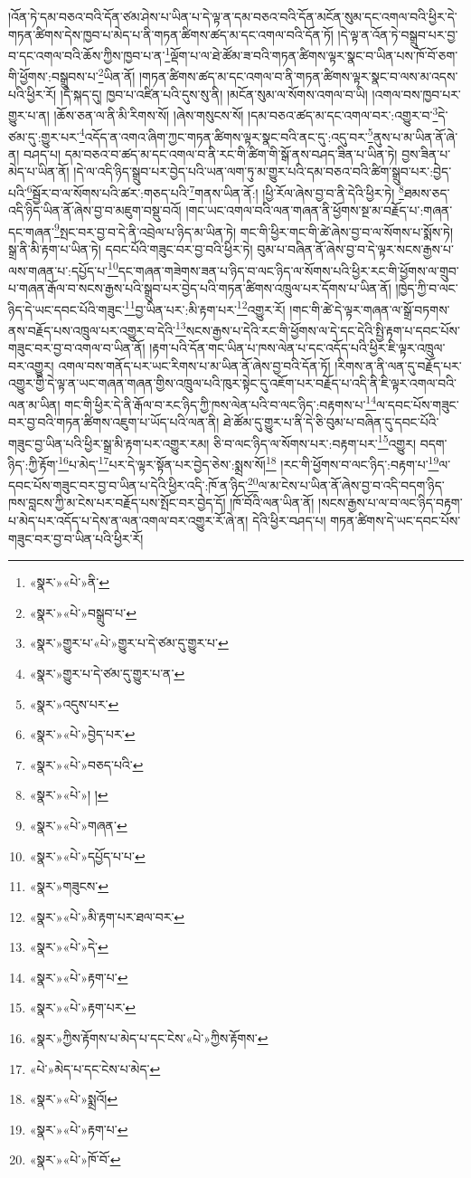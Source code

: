 །འོན་ཏེ་དམ་བཅའ་བའི་དོན་ཙམ་ཤེས་པ་ཡིན་པ་དེ་ལྟ་ན་དམ་བཅའ་བའི་དོན་མངོན་སུམ་དང་འགལ་བའི་ཕྱིར་དེ་གཏན་ཚིགས་དེས་ཁྱབ་པ་མེད་པ་ནི་གཏན་ཚིགས་ཚད་མ་དང་འགལ་བའི་དོན་ཏོ། །དེ་ལྟ་ན་འོན་ཏེ་བསྒྲུབ་པར་བྱ་བ་དང་འགལ་བའི་ཆོས་ཀྱིས་ཁྱབ་པ་ན་\footnote{«སྣར་»«པེ་»ནི་}ལྡོག་པ་ལ་ཐེ་ཚོམ་ཟ་བའི་གཏན་ཚིགས་ལྟར་སྣང་བ་ཡིན་པས་ཁོ་བོ་ཅག་གི་ཕྱོགས་:བསྒྲུབས་པ་\footnote{«སྣར་»«པེ་»བསྒྲུབ་པ་}ཡིན་ནོ། །གཏན་ཚིགས་ཚད་མ་དང་འགལ་བ་ནི་གཏན་ཚིགས་ལྟར་སྣང་བ་ལས་མ་འདས་པའི་ཕྱིར་རོ། །དེ་སྐད་དུ། ཁྱབ་པ་འཛིན་པའི་དུས་སུ་ནི། །མངོན་སུམ་ལ་སོགས་འགལ་བ་ཡི། །འགལ་བས་ཁྱབ་པར་གྱུར་པ་ན། །ཆོས་ཅན་ལ་ནི་མི་རིགས་སོ། །ཞེས་གསུངས་སོ། །དམ་བཅའ་ཚད་མ་དང་འགལ་བར་:འགྱུར་བ་\footnote{«སྣར་»གྱུར་པ་«པེ་»གྱུར་པ་དེ་ཙམ་དུ་གྱུར་པ་}དེ་ཙམ་དུ་:གྱུར་པར་\footnote{«སྣར་»གྱུར་པ་དེ་ཙམ་དུ་གྱུར་པ་ན་}འདོད་ན་འགའ་ཞིག་ཀྱང་གཏན་ཚིགས་ལྟར་སྣང་བའི་ནང་དུ་:འདུ་བར་\footnote{«སྣར་»འདུས་པར་}ནུས་པ་མ་ཡིན་ནོ་ཞེ་ན། བཤད་པ། དམ་བཅའ་བ་ཚད་མ་དང་འགལ་བ་ནི་རང་གི་ཚིག་གི་སྒོ་ནས་བཤད་ཟིན་པ་ཡིན་ཏེ། བྱས་ཟིན་པ་མེད་པ་ཡིན་ནོ། །དེ་ལ་འདི་ཉིད་སྒྲུབ་པར་བྱེད་པའི་ཡན་ལག་ཏུ་མ་གྱུར་པའི་དམ་བཅའ་བའི་ཚིག་སྒྲུབ་པར་:བྱེད་པའི་\footnote{«སྣར་»«པེ་»བྱེད་པར་}སྦྱོར་བ་ལ་སོགས་པའི་ཚར་:གཅད་པའི་\footnote{«སྣར་»«པེ་»བཅད་པའི་}གནས་ཡིན་ནོ:། །ཕྱི་རོལ་ཞེས་བྱ་བ་ནི་དེའི་ཕྱིར་ཏེ། \footnote{«སྣར་»«པེ་»། ། }ཐམས་ཅད་འདི་ཉིད་ཡིན་ནོ་ཞེས་བྱ་བ་མཇུག་བསྡུ་བའོ། །གང་ཡང་འགལ་བའི་ལན་གཞན་ནི་ཕྱོགས་སྔ་མ་བརྗོད་པ་:གཞན་དང་གཞན་\footnote{«སྣར་»«པེ་»གཞན་}སྤང་བར་བྱ་བ་དེ་ནི་འབྲེལ་པ་ཉིད་མ་ཡིན་ཏེ། གང་གི་ཕྱིར་གང་གི་ཚེ་ཞེས་བྱ་བ་ལ་སོགས་པ་སྨོས་ཏེ། སྒྲ་ནི་མི་རྟག་པ་ཡིན་ཏེ། དབང་པོའི་གཟུང་བར་བྱ་བའི་ཕྱིར་ཏེ། བུམ་པ་བཞིན་ནོ་ཞེས་བྱ་བ་དེ་ལྟར་སངས་རྒྱས་པ་ལས་གཞན་པ་:དཔྱོད་པ་\footnote{«སྣར་»«པེ་»དཔྱོད་པ་པ་}དང་གཞན་གཟེགས་ཟན་པ་ཉིད་བ་ལང་ཉིད་ལ་སོགས་པའི་ཕྱིར་རང་གི་ཕྱོགས་ལ་གྲུབ་པ་གཞན་རྒོལ་བ་སངས་རྒྱས་པའི་སྒྲུབ་པར་བྱེད་པའི་གཏན་ཚིགས་འཁྲུལ་པར་དོགས་པ་ཡིན་ནོ། །ཁྱེད་ཀྱི་བ་ལང་ཉིད་དེ་ཡང་དབང་པོའི་གཟུང་\footnote{«སྣར་»གཟུངས་}བྱ་ཡིན་པར་:མི་རྟག་པར་\footnote{«སྣར་»«པེ་»མི་རྟག་པར་ཐལ་བར་}འགྱུར་རོ། །གང་གི་ཚེ་དེ་ལྟར་གཞན་ལ་སྒྲོ་བཏགས་ནས་བརྗོད་པས་འཁྲུལ་པར་འགྱུར་བ་དེའི་\footnote{«སྣར་»«པེ་»དེ་}སངས་རྒྱས་པ་དེའི་རང་གི་ཕྱོགས་ལ་དེ་དང་དེའི་སྤྱི་རྟག་པ་དབང་པོས་གཟུང་བར་བྱ་བ་འགལ་བ་ཡིན་ནོ། །རྟག་པའི་དོན་གང་ཡིན་པ་ཁས་ལེན་པ་དང་འདོད་པའི་ཕྱིར་ཇི་ལྟར་འཁྲུལ་བར་འགྱུར། འགལ་བས་གནོད་པར་ཡང་རིགས་པ་མ་ཡིན་ནོ་ཞེས་བྱ་བའི་དོན་ཏོ། །རིགས་ན་ནི་ལན་དུ་བརྗོད་པར་འགྱུར་གྱི་དེ་ལྟ་ན་ཡང་གཞན་གཞན་གྱིས་འཁྲུལ་པའི་ཁུར་སྟེང་དུ་འཇོག་པར་བརྗོད་པ་འདི་ནི་ཇི་ལྟར་འགལ་བའི་ལན་མ་ཡིན། གང་གི་ཕྱིར་དེ་ནི་རྒོལ་བ་རང་ཉིད་ཀྱི་ཁས་ལེན་པའི་བ་ལང་ཉིད་:བརྟགས་པ་\footnote{«སྣར་»«པེ་»རྟག་པ་}ལ་དབང་པོས་གཟུང་བར་བྱ་བའི་གཏན་ཚིགས་འཇུག་པ་ཡོད་པའི་ལན་ནི། ཐེ་ཚོམ་དུ་གྱུར་པ་ནི་དེ་ཅི་བུམ་པ་བཞིན་དུ་དབང་པོའི་གཟུང་བྱ་ཡིན་པའི་ཕྱིར་སྒྲ་མི་རྟག་པར་འགྱུར་རམ། ཅི་བ་ལང་ཉིད་ལ་སོགས་པར་:བརྟག་པར་\footnote{«སྣར་»«པེ་»རྟག་པར་}འགྱུར། བདག་ཉིད་:ཀྱི་རྟོག་\footnote{«སྣར་»ཀྱིས་རྟོགས་པ་མེད་པ་དང་ངེས་«པེ་»ཀྱིས་རྟོགས་}པ་མེད་\footnote{«པེ་»མེད་པ་དང་ངེས་པ་མེད་}པར་དེ་ལྟར་སྟོན་པར་བྱེད་ཅེས་:སྨྲས་སོ།\footnote{«སྣར་»«པེ་»སྨྲའོ།} །རང་གི་ཕྱོགས་བ་ལང་ཉིད་:བརྟག་པ་\footnote{«སྣར་»«པེ་»རྟག་པ་}ལ་དབང་པོས་གཟུང་བར་བྱ་བ་ཡིན་པ་དེའི་ཕྱིར་འདི་:ཁོ་ན་ཉིད་\footnote{«སྣར་»«པེ་»ཁོ་བོ་}ལ་མ་ངེས་པ་ཡིན་ནོ་ཞེས་བྱ་བ་འདི་བདག་ཉིད་ཁས་བླངས་ཀྱི་མ་ངེས་པར་བརྗོད་པས་སྤོང་བར་བྱེད་དོ། །ཁོ་བོའི་ལན་ཡིན་ནོ། །སངས་རྒྱས་པ་ལ་བ་ལང་ཉིད་བརྟག་པ་མེད་པར་འདོད་པ་དེས་ན་ལན་འགལ་བར་འགྱུར་རོ་ཞེ་ན། དེའི་ཕྱིར་བཤད་པ། གཏན་ཚིགས་དེ་ཡང་དབང་པོས་གཟུང་བར་བྱ་བ་ཡིན་པའི་ཕྱིར་རོ། 